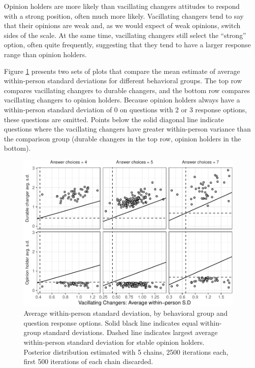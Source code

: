 \documentclass[12pt,]{article}
\begin{document}
Opinion holders are more likely than vacillating changers attitudes to respond with a strong position, often much more likely. Vacillating changers tend to say that their opinions are weak and, as we would expect of weak opinions, switch sides of the scale. At the same time, vacillating changers still select the ``strong'' option, often quite frequently, suggesting that they tend to have a larger response range than opinion holders.

Figure \ref{fig:sdcomp} presents two sets of plots that compare the mean estimate of average within-person standard deviations for different behavioral groups. The top row compares vacillating changers to durable changers, and the bottom row compares vacillating changers to opinion holders. Because opinion holders always have a within-person standard deviation of 0 on questions with 2 or 3 response options, these questions are omitted. Points below the solid diagonal line indicate questions where the vacillating changers have greater within-person variance than the comparison group (durable changers in the top row, opinion holders in the bottom).

\begin{figure}
\centering
\includegraphics{ambivalence_everywhere_files/figure-latex/sdcomp-1.pdf}
\caption{\label{fig:sdcomp}Average within-person standard deviation, by behavioral group and question response options. Solid black line indicates equal within-group standard deviations. Dashed line indicates largest average within-person standard deviation for stable opinion holders. Posterior distribution estimated with 5 chains, 2500 iterations each, first 500 iterations of each chain discarded.}
\end{figure}
\end{document}
